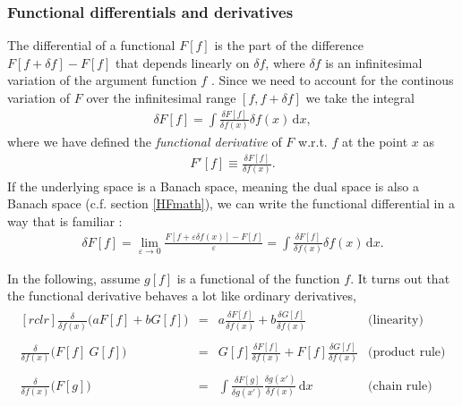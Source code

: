 \documentclass[a4paper]{article}
\newcommand{\dx}{\,\mathrm{d}x}
\newcommand{\mat} [2]{\begin{matrix}[#1]  #2 \end{matrix}}   %
\newcommand{\nn}{\nonumber}
\newcommand{\comment}[1]{\ignorespaces}
\begin{document}
\subsubsection{Functional differentials and derivatives}
The differential of a functional $F[f]$ is the part of the difference $F[f+\delta f]-F[f]$ that depends linearly on $\delta f$, where $\delta f$ is an infinitesimal variation of the argument function $f$ \cite{yangparr}\comment{246}. Since we need to account for the continous variation of $F$ over the infinitesimal range $[f,f+\delta f]$ we take the integral
\begin{align}
\delta F[f] = \int \frac{\delta F[f]}{\delta f(x)}\delta f(x)\dx,
\end{align}
where we have defined the \emph{functional derivative} of $F$ w.r.t. $f$ at the point $x$ as 
\begin{align}
F'[f]\equiv\frac{\delta F[f]}{\delta f(x)}.
\end{align}
If the underlying space is a Banach space, meaning the dual space is also a Banach space (c.f. section \ref{HFmath}), we can write the functional differential in a way that is familiar \cite{hfreview}\comment{p3093}:
\begin{align}
\delta F[f]=\lim_{\varepsilon\rightarrow 0}\frac{F[f+\varepsilon \delta f(x)] - F[f]}{\varepsilon} = \int \frac{\delta F[f]}{\delta f(x)}\delta f(x)\dx.
\end{align}

In the following, assume $g[f]$ is a functional of the function $f$. It turns out that the functional derivative behaves a lot like ordinary derivatives, \cite{toulouse}\comment{p42}
\begin{align}
\mat{rclr}{
  \displaystyle\frac{\delta}{\delta f(x)}\Big(aF[f]+bG[f] \Big) & \displaystyle= & \displaystyle a \frac{\delta F[f]}{\delta f(x)} + b\frac{\delta G[f]}{\delta f(x)} & \text{(linearity)} \\
%
\\
%
  \displaystyle\frac{\delta}{\delta f(x)}\Big(F[f]\ G[f] \Big) & \displaystyle= & \displaystyle G[f]\frac{\delta F[f]}{\delta f(x)} + F[f]\frac{\delta G[f]}{\delta f(x)} & \text{(product rule)} \\
%
\\
%
  \displaystyle\frac{\delta}{\delta f(x)}\Big(F[g]\Big) & \displaystyle= & \displaystyle\int \frac{\delta F[g]}{\delta g(x')}\frac{\delta g(x')}{\delta f(x)}\dx & \text{(chain rule)} \\
} \nn
\end{align}
\end{document}
